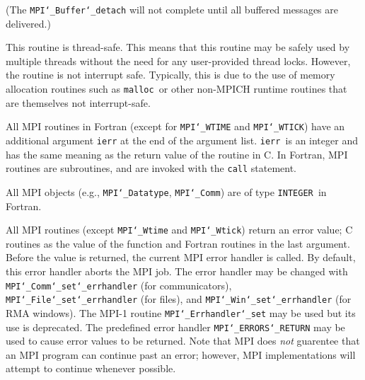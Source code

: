 (The {\tt MPI{\tt \char`\_}Buffer{\tt \char`\_}detach} will not complete until all buffered messages are
delivered.)
\par
{}
\par
This routine is thread-safe.  This means that this routine may be
safely used by multiple threads without the need for any user-provided
thread locks.  However, the routine is not interrupt safe.  Typically,
this is due to the use of memory allocation routines such as {\tt malloc
}or other non-MPICH runtime routines that are themselves not interrupt-safe.
\par
{}
All MPI routines in Fortran (except for {\tt MPI{\tt \char`\_}WTIME} and {\tt MPI{\tt \char`\_}WTICK}) have
an additional argument {\tt ierr} at the end of the argument list.  {\tt ierr
}is an integer and has the same meaning as the return value of the routine
in C.  In Fortran, MPI routines are subroutines, and are invoked with the
{\tt call} statement.
\par
All MPI objects (e.g., {\tt MPI{\tt \char`\_}Datatype}, {\tt MPI{\tt \char`\_}Comm}) are of type {\tt INTEGER
}in Fortran.
\par
{}
\par
All MPI routines (except {\tt MPI{\tt \char`\_}Wtime} and {\tt MPI{\tt \char`\_}Wtick}) return an error value;
C routines as the value of the function and Fortran routines in the last
argument.  Before the value is returned, the current MPI error handler is
called.  By default, this error handler aborts the MPI job.  The error handler
may be changed with {\tt MPI{\tt \char`\_}Comm{\tt \char`\_}set{\tt \char`\_}errhandler} (for communicators),
{\tt MPI{\tt \char`\_}File{\tt \char`\_}set{\tt \char`\_}errhandler} (for files), and {\tt MPI{\tt \char`\_}Win{\tt \char`\_}set{\tt \char`\_}errhandler} (for
RMA windows).  The MPI-1 routine {\tt MPI{\tt \char`\_}Errhandler{\tt \char`\_}set} may be used but
its use is deprecated.  The predefined error handler
{\tt MPI{\tt \char`\_}ERRORS{\tt \char`\_}RETURN} may be used to cause error values to be returned.
Note that MPI does {\em not} guarentee that an MPI program can continue past
an error; however, MPI implementations will attempt to continue whenever
possible.
\par
{}
